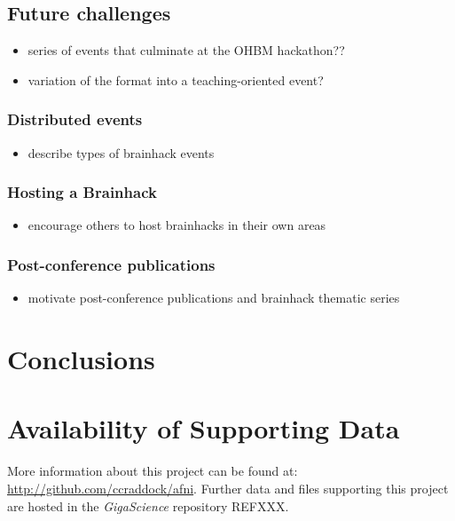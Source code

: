 \documentclass[11pt]{bmc_article_s50}
\providecommand{\tightlist}{%
  \setlength{\itemsep}{0pt}\setlength{\parskip}{0pt}}
\begin{document}
\subsection{Future challenges}\label{future-challenges}

\begin{itemize}
\tightlist
\item
  series of events that culminate at the OHBM hackathon??
\item
  variation of the format into a teaching-oriented event?
\end{itemize}

\subsubsection{Distributed events}\label{distributed-events}

\begin{itemize}
\tightlist
\item
  describe types of brainhack events
\end{itemize}

\subsubsection{Hosting a Brainhack}\label{hosting-a-brainhack}

\begin{itemize}
\tightlist
\item
  encourage others to host brainhacks in their own areas
\end{itemize}

\subsubsection{Post-conference
publications}\label{post-conference-publications}

\begin{itemize}
\tightlist
\item
  motivate post-conference publications and brainhack thematic series
\end{itemize}

\section{Conclusions}\label{conclusions}


\section*{Availability of Supporting Data}
More information about this project can be found at: \url{http://github.com/ccraddock/afni}. Further data and files supporting this project are hosted in the \emph{GigaScience} repository REFXXX.
\end{document}
